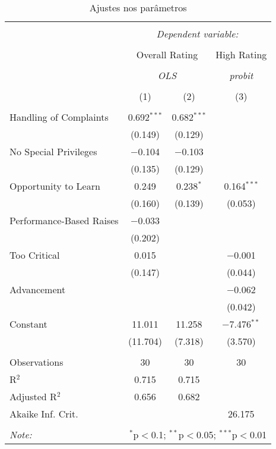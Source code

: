 \begin{table}[!htbp] \centering 
	\caption{Ajustes nos parâmetros} 
	\label{} 
	\begin{tabular}{@{\extracolsep{5pt}}lccc} 
		\\[-1.8ex]\hline 
		\hline \\[-1.8ex] 
								& \multicolumn{3}{c}{\textit{Dependent variable:}} \\ 
		\cline{2-4} 
		\\[-1.8ex] 				& \multicolumn{2}{c}{Overall Rating} 	& High Rating \\ 
		\\[-1.8ex] 				& \multicolumn{2}{c}{\textit{OLS}} 		& \textit{probit} \\ 
		\\[-1.8ex]				& (1) 			& (2) 					& (3)\\ 
		\hline \\[-1.8ex] 
		Handling of Complaints 	& 0.692$^{***}$ & 0.682$^{***}$ 		&  \\ 
								& (0.149) 		& (0.129) 				&  \\ 
		No Special Privileges 	& $-$0.104 		& $-$0.103 				&  \\ 
								& (0.135) 		& (0.129) 				&  \\ 
		Opportunity to Learn 	& 0.249 		& 0.238$^{*}$ 			& 0.164$^{***}$ \\ 
								& (0.160) 		& (0.139) 				& (0.053) \\ 
		Performance-Based Raises& $-$0.033 		& 						&  \\ 
								& (0.202) 		&  						&  \\ 
		Too Critical			& 0.015 		&  						& $-$0.001 \\ 
								& (0.147)		&  						& (0.044) \\ 
		Advancement 			&  				&  						& $-$0.062 \\ 
								&  				&  						& (0.042) \\ 
		Constant 				& 11.011 		& 11.258 				& $-$7.476$^{**}$ \\ 
								& (11.704) 		& (7.318) 				& (3.570) \\ 
		\hline \\[-1.8ex] 
		Observations 			& 30 			& 30 					& 30 \\ 
		R$^{2}$ 				& 0.715			& 0.715 				&  \\ 
		Adjusted R$^{2}$ 		& 0.656 		& 0.682 				&  \\ 
		Akaike Inf. Crit. 		& 				&  						& 26.175 \\ 
		\hline 
		\hline \\[-1.8ex] 
		\textit{Note:}  		& \multicolumn{3}{r}{$^{*}$p$<$0.1; $^{**}$p$<$0.05; $^{***}$p$<$0.01} \\ 
	\end{tabular} 
	\label{table:2}
\end{table} 



\lipsum[2-4]
